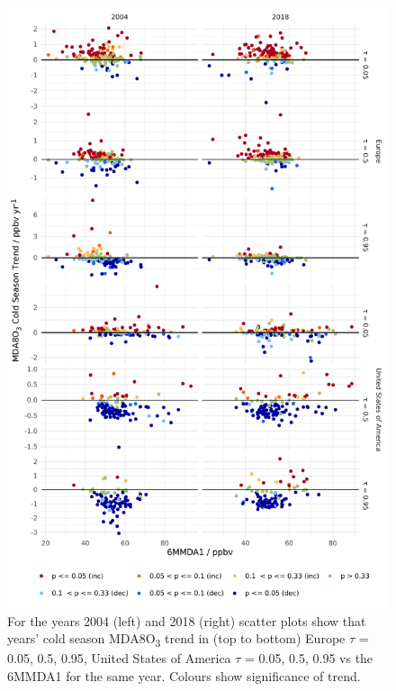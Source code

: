 \documentclass{article}
\begin{document}
\begin{figure}[p]
\centering
\includegraphics[height=0.75\textheight]{figures/si_figures/fS24_mda8_cold_sig_mda8_6mmda1.pdf}
\caption{For the years 2004 (left) and 2018 (right) scatter plots show that years' cold season MDA8O\textsubscript{3} trend in (top to bottom) Europe $\tau$ = 0.05, 0.5, 0.95, United States of America $\tau$ = 0.05, 0.5, 0.95 vs the 6MMDA1 for the same year. Colours show significance of trend.}
\label{si_fig:mda8_cold_sig_mda8_6mmda1}
\end{figure}
\clearpage



\clearpage


\end{document}
